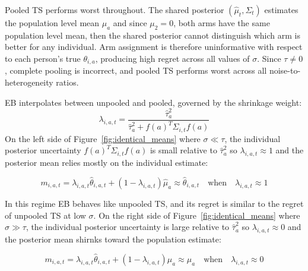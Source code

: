 \documentclass[letterpaper, 9pt]{extarticle}
\begin{document}
Pooled TS performs worst throughout. The shared posterior $(\hat{\mu}_t, \Sigma_t)$ estimates the population level mean $\mu_a$ and since $\mu_2=0$, both arms have the same population level mean, then the shared posterior cannot distinguish which arm is better for any individual. Arm assignment is therefore uninformative with respect to each person's true $\theta_{i,a}$, producing high regret across all values of $\sigma$. Since $\tau \neq 0$, complete pooling is incorrect, and pooled TS performs worst across all noise-to-heterogeneity ratios. 

EB interpolates between unpooled and pooled, governed by the shrinkage weight:
$$\lambda_{i,a,t} = \frac{\hat{\tau}_a^2}{\hat{\tau}_a^2 + f(a)^T \Sigma_{i,t}f(a)}$$
On the left side of Figure~\ref{fig:identical_means} where $\sigma \ll \tau$, the individual posterior uncertainty $f(a)^T \Sigma_{i,t}f(a)$ is small relative to $\hat{\tau}_a^2$ so $\lambda_{i,a,t} \approx 1$ and the posterior mean relies mostly on the individual estimate:


$$m_{i,a,t} = \lambda_{i,a,t} \hat{\theta}_{i,a,t} + (1-\lambda_{i,a,t})\hat{\mu}_a \approx \hat{\theta}_{i,a,t} \quad \text{when} \quad \lambda_{i,a,t} \approx 1$$

In this regime EB behaves like unpooled TS, and its regret is similar to the regret of unpooled TS at low $\sigma$. On the right side of Figure~\ref{fig:identical_means} where $\sigma \gg \tau$, the individual posterior uncertainty is large relative to $\hat{\tau}_a^2$ so $\lambda_{i,a,t} \approx 0$ and the posterior mean shirnks toward the population estimate:

$$m_{i,a,t} = \lambda_{i,a,t} \hat{\theta}_{i,a,t} + (1-\lambda_{i,a,t})\hat{\mu}_a \approx \hat{\mu}_{a} \quad \text{when} \quad \lambda_{i,a,t} \approx 0$$
\end{document}
